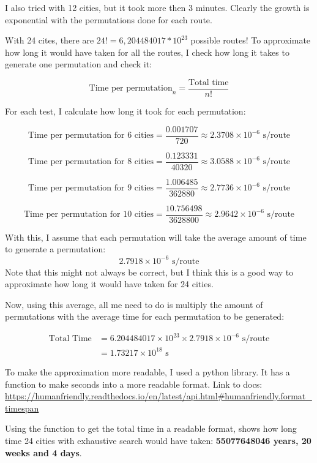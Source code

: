 \documentclass{article}
\begin{document}
    I also tried with 12 cities, but it took more then 3 minutes. Clearly the growth is exponential with the permutations done for each route. 

    With 24 cites, there are $24! = 6,204484017*10^{23}$ possible routes!
    To approximate how long it would have taken for all the routes, I check how long it takes to generate one permutation and check it: 

    \[
    \text{Time per permutation}_n = \frac{\text{Total time}}{n!}
    \]

    For each test, I calculate how long it took for each permutation: 

    \[
    \text{Time per permutation for 6 cities} = \frac{0.001707}{720} \approx 2.3708 \times 10^{-6} \text{ s/route}
    \]

    \[
    \text{Time per permutation for 8 cities} = \frac{0.123331}{40320} \approx 3.0588 \times 10^{-6} \text{ s/route}
    \]

    \[
    \text{Time per permutation for 9 cities} = \frac{1.006485}{362880} \approx 2.7736 \times 10^{-6} \text{ s/route}
    \]

    \[
    \text{Time per permutation for 10 cities} = \frac{10.756498}{3628800} \approx 2.9642 \times 10^{-6} \text{ s/route}
    \]

    With this, I assume that each permutation will take the average amount of time to generate a permutation: \[2.7918\times10^{-6} \text{ s/route} \]
    Note that this might not always be correct, but I think this is a good way to approximate how long it would have taken for 24 cities. 

    Now, using this average, all me need to do is multiply the amount of permutations with the average time for each permutation to be generated: 

    \[
    \begin{aligned}
        \text{Total Time} &= 6.204484017 \times 10^{23} \times 2.7918\times10^{-6} \text{ s/route} \\
                          &= 1.73217 \times 10^{18} \text{ s}
    \end{aligned}
    \]

    To make the approximation more readable, I used a python library. 
    It has a function to make seconds into a more readable format. Link to docs: 
    \url{https://humanfriendly.readthedocs.io/en/latest/api.html#humanfriendly.format_timespan} \newline

    Using the function to get the total time in a readable format, shows how long time 24 cities with exhaustive search would have taken: \textbf{55077648046 years, 20 weeks and 4 days}.
\end{document}
